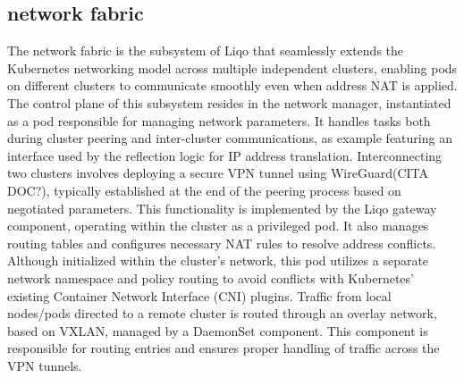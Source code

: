 \subsection{network fabric}
The network fabric is the subsystem of Liqo that seamlessly extends the Kubernetes networking model across multiple independent clusters, enabling pods on different clusters to communicate smoothly even when address NAT is applied.
The control plane of this subsystem resides in the network manager, instantiated as a pod responsible for managing network parameters. It handles tasks both during cluster peering and inter-cluster communications, as example featuring an interface used by the reflection logic for IP address translation.
Interconnecting two clusters involves deploying a secure VPN tunnel using WireGuard(CITA DOC?), typically established at the end of the peering process based on negotiated parameters. This functionality is implemented by the Liqo gateway component, operating within the cluster as a privileged pod. It also manages routing tables and configures necessary NAT rules to resolve address conflicts. Although initialized within the cluster's network, this pod utilizes a separate network namespace and policy routing to avoid conflicts with Kubernetes' existing Container Network Interface (CNI) plugins.
Traffic from local nodes/pods directed to a remote cluster is routed through an overlay network, based on VXLAN, managed by a DaemonSet component. This component is responsible for routing entries and ensures proper handling of traffic across the VPN tunnels.

